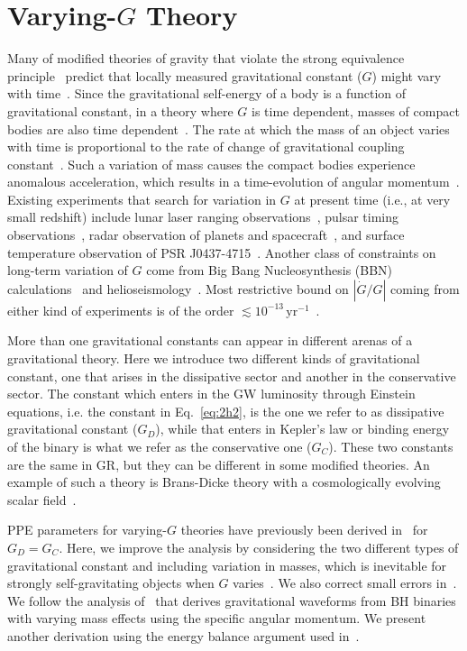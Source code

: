 \documentclass[prd,twocolumn,nofootinbib]{revtex4-1}
\begin{document}
 \section{Varying-$G$ Theory}\label{gdot}
 
Many of modified theories of gravity that violate the strong equivalence principle~\cite{DiCasola:2013iia,Will:2014kxa,0264-9381-7-10-007} predict that locally measured gravitational constant ($G$) might vary with time~\cite{uzan:2010pm}. Since the gravitational self-energy of a body is a function of gravitational constant, in a theory where $G$ is time dependent, masses of compact bodies are also time dependent~\cite{PhysRevLett.65.953}. The rate at which the mass of an object varies with time is proportional to the rate of change of gravitational coupling constant~\cite{PhysRevLett.65.953}. Such a variation of mass causes the compact bodies experience anomalous acceleration, which results in a time-evolution of angular momentum~\cite{PhysRevLett.65.953}. Existing experiments that search for variation in $G$ at present time (i.e., at very small redshift) include lunar laser ranging observations~\cite{Williams:2004qba}, pulsar timing observations~\cite{Deller:2008jx,Kaspi:1994hp}, radar observation of planets and spacecraft~\cite{Pitjeva2005}, and surface temperature observation of PSR J0437-4715~\cite{Jofre:2006ug}. Another class of constraints on long-term variation of $G$ come from Big Bang Nucleosynthesis (BBN) calculations~\cite{Bambi:2005fi,Copi:2003xd} and helioseismology~\cite{0004-637X-498-2-871}. Most restrictive bound on $|\dot{G}/G|$ coming from either kind of experiments is of the order $\lesssim 10^{-13} \,\mathrm{yr}^{-1}$~\cite{Yunes:2009bv}.

More than one gravitational constants can appear in different arenas of a gravitational theory. Here we introduce two different kinds of gravitational constant, one that arises in the dissipative sector and another in the conservative sector. The constant which enters in the GW luminosity through Einstein equations, i.e. the constant in Eq.~\eqref{eq:2h2}, is the one we refer to as dissipative gravitational constant ($G_D$), while that enters in Kepler's law or binding energy of the binary is what we refer as the conservative one ($G_C$). These two constants are the same in GR, but they can be different in some modified theories. An example of such a theory is Brans-Dicke theory with a cosmologically evolving scalar field~\cite{Will2006}. 

PPE parameters for varying-$G$ theories have previously been derived in~\cite{Yunes:2009bv} for $G_D = G_C$. Here, we improve the analysis by considering the two different types of gravitational constant and including variation in masses, which is inevitable for strongly self-gravitating objects when $G$ varies~\cite{PhysRevLett.65.953}.
We also correct small errors in~\cite{Yunes:2009bv}. We follow the analysis of~\cite{Yagi:2011yu} that derives gravitational waveforms from BH binaries with varying mass effects using the specific angular momentum. We present another derivation using the energy balance argument used in~\cite{Yunes:2009bv}.
\end{document}

